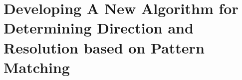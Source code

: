\documentclass[tightenlines,
twocolumn,prl,notitlepage,nofootinbib,preprintnumbers,longbibliography]{revtex4-1}
\begin{document}



\section{Developing A New Algorithm for Determining Direction and Resolution based on Pattern Matching}
\label{sec:deltaphi}

















\end{document}
